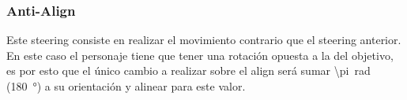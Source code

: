 \subsubsection{Anti-Align}

Este steering consiste en realizar el movimiento contrario que el steering anterior. En este caso el personaje tiene que tener una rotación opuesta a la del objetivo, es por esto que el único cambio a realizar sobre el align será sumar \SI[parse-numbers=false]{\pi}{\radian} (\SI{180}{\degree}) a su orientación y alinear para este valor.



